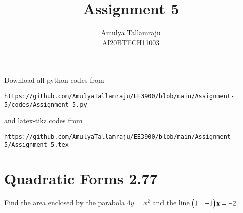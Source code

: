 \documentclass[journal,12pt,twocolumn]{IEEEtran}
\begin{document}
     \def\centbox#1{\makebox[0in]{#1}}
     \def\topbox#1{\raisebox{-\baselineskip}[0in][0in]{#1}}
     \def\midbox#1{\raisebox{-0.5\baselineskip}[0in][0in]{#1}}
\vspace{3cm}
\title{Assignment 5}
\author{Amulya Tallamraju \\ AI20BTECH11003}
\maketitle
\newpage
\bigskip
\renewcommand{\thefigure}{\theenumi}
\renewcommand{\thetable}{\theenumi}
Download all python codes from 
\begin{lstlisting}
https://github.com/AmulyaTallamraju/EE3900/blob/main/Assignment-5/codes/Assignment-5.py
\end{lstlisting}
%
and latex-tikz codes from 
%
\begin{lstlisting}
https://github.com/AmulyaTallamraju/EE3900/blob/main/Assignment-5/Assignment-5.tex
\end{lstlisting}
\section{Quadratic Forms 2.77}
Find the area enclosed by the parabola $4y = x^2$ and the line $\begin{pmatrix}1& -1\end{pmatrix}\mathbf{x} = -2$.
\end{document}
